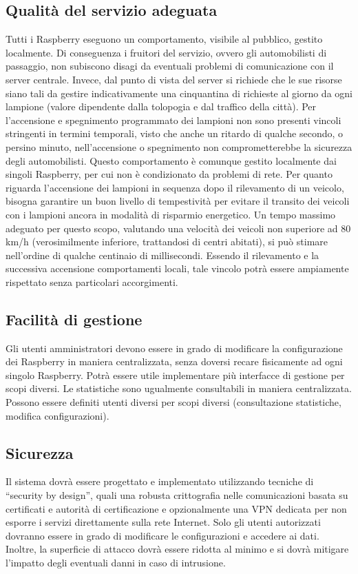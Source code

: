 \subsection{Qualità del servizio adeguata}
Tutti i Raspberry eseguono un comportamento, visibile al pubblico, gestito localmente. Di conseguenza i fruitori del servizio, ovvero gli automobilisti di passaggio, non subiscono disagi da eventuali problemi di comunicazione con il server centrale. Invece, dal punto di vista del server si richiede che le sue risorse siano tali da gestire indicativamente una cinquantina di richieste al giorno da ogni lampione (valore dipendente dalla tolopogia e dal traffico della città).
Per l'accensione e spegnimento programmato dei lampioni non sono presenti vincoli stringenti in termini temporali, visto che anche un ritardo di qualche secondo, o persino minuto, nell'accensione o spegnimento non comprometterebbe la sicurezza degli automobilisti. Questo comportamento è comunque gestito localmente dai singoli Raspberry, per cui non è condizionato da problemi di rete.
Per quanto riguarda l'accensione dei lampioni in sequenza dopo il rilevamento di un veicolo, bisogna garantire un buon livello di tempestività per evitare il transito dei veicoli con i lampioni ancora in modalità di risparmio energetico. Un tempo massimo adeguato per questo scopo, valutando una velocità dei veicoli non superiore ad 80 km/h (verosimilmente inferiore, trattandosi di centri abitati), si può stimare nell'ordine di qualche centinaio di millisecondi. Essendo il rilevamento e la successiva accensione comportamenti locali, tale vincolo potrà essere ampiamente rispettato senza particolari accorgimenti.
\subsection{Facilità di gestione}
Gli utenti amministratori devono essere in grado di modificare la configurazione dei Raspberry in maniera centralizzata, senza doversi recare fisicamente ad ogni singolo Raspberry. Potrà essere utile implementare più interfacce di gestione per scopi diversi. Le statistiche sono ugualmente consultabili in maniera centralizzata. Possono essere definiti utenti diversi per scopi diversi (consultazione statistiche, modifica configurazioni).
\subsection{Sicurezza}
Il sistema dovrà essere progettato e implementato utilizzando tecniche di ``security by design'', quali una robusta crittografia nelle comunicazioni basata su certificati e autorità di certificazione e opzionalmente una VPN dedicata per non esporre i servizi direttamente sulla rete Internet. Solo gli utenti autorizzati dovranno essere in grado di modificare le configurazioni e accedere ai dati. Inoltre, la superficie di attacco dovrà essere ridotta al minimo e si dovrà mitigare l'impatto degli eventuali danni in caso di intrusione.
